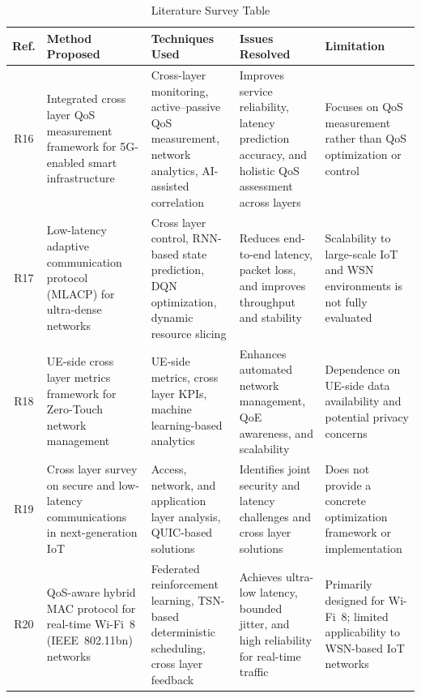 \documentclass[a4paper,fleqn]{cas-dc}
\numberwithin{equation}{section}
\begin{document}
\begin{table}[h]
\centering
\renewcommand{\arraystretch}{1.2}
\setlength{\tabcolsep}{4pt}
\caption{Literature Survey Table }
\label{tab:lit_survey}
\begin{tabular}{|c|p{3.7cm}|p{4.5cm}|p{4.5cm}|p{3.7cm}|}
\hline
\textbf{Ref.} & \textbf{Method Proposed} & \textbf{Techniques Used} & \textbf{Issues Resolved} & \textbf{Limitation} \\
\hline

R16 & Integrated cross layer QoS measurement framework for 5G-enabled smart infrastructure \cite{balvad2025integrated}& Cross-layer monitoring, active--passive QoS measurement, network analytics, AI-assisted correlation & Improves service reliability, latency prediction accuracy, and holistic QoS assessment across layers & Focuses on QoS measurement rather than QoS optimization or control \\
\hline

R17 & Low-latency adaptive communication protocol (MLACP) for ultra-dense networks \cite{he2025low}& Cross layer control, RNN-based state prediction, DQN optimization, dynamic resource slicing & Reduces end-to-end latency, packet loss, and improves throughput and stability & Scalability to large-scale IoT and WSN environments is not fully evaluated \\
\hline

R18 & UE-side cross layer metrics framework for Zero-Touch network management \cite{tarrias2023ue}& UE-side metrics, cross layer KPIs, machine learning-based analytics & Enhances automated network management, QoE awareness, and scalability & Dependence on UE-side data availability and potential privacy concerns \\
\hline

R19 & Cross layer survey on secure and low-latency communications in next-generation IoT \cite{martalo2024cross}& Access, network, and application layer analysis, QUIC-based solutions & Identifies joint security and latency challenges and cross layer solutions & Does not provide a concrete optimization framework or implementation\\
\hline

R20 & QoS-aware hybrid MAC protocol for real-time Wi-Fi~8 (IEEE~802.11bn) networks \cite{bt5276263qos}& Federated reinforcement learning, TSN-based deterministic scheduling, cross layer feedback & Achieves ultra-low latency, bounded jitter, and high reliability for real-time traffic & Primarily designed for Wi-Fi~8; limited applicability to WSN-based IoT networks \\
\hline


\end{tabular}
\end{table}
\end{document}
